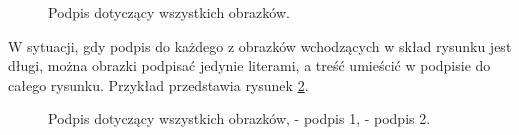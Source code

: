 \begin{figure}[H]
	\centering
	\hspace{.4em} %
	\hspace{.4em}
	\caption{Podpis dotyczący wszystkich obrazków. \label{fig:nazwisko_2}}
\end{figure}
W sytuacji, gdy podpis do każdego z obrazków wchodzących w skład rysunku jest długi, można obrazki podpisać jedynie literami, a treść umieścić w podpisie do całego rysunku. Przykład przedstawia rysunek \ref{fig:nazwisko_3}.
\begin{figure}[H]
	\centering
	\hspace{.4em} %
	\caption{Podpis dotyczący wszystkich obrazków, \protect{} - podpis 1, \protect{} - podpis 2.}
	\label{fig:nazwisko_3}
\end{figure}
